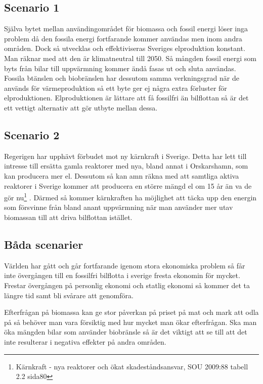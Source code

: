 \documentclass[a4paper,11pt,fleqn, titlepage]{article}
\begin{document}
\subsection{Scenario 1}

Själva bytet mellan användingområdet för biomassa och fossil energi löser inga problem då den fossila energi fortfarande kommer användas men inom andra områden. Dock så utvecklas och effektiviseras Sveriges elproduktion konstant. Man räknar med att den är klimatneutral till 2050. Så mångden fossil energi som byts från bilar till uppvärmning kommer ändå fasas ut och sluta användas. Fossila btänslen och biobränslen har dessutom samma verkningsgrad när de används för värmeproduktion så ett byte ger ej några extra förluster för elproduktionen.  Elproduktionen är lättare att få fossilfri än bilflottan så är det ett vettigt alternativ att gör utbyte mellan dessa.

\subsection{Scenario 2}
Regerigen har upphävt förbudet mot ny kärnkraft i Sverige. Detta har lett till intresse till ersätta gamla reaktorer med nya, bland annat i Orskarshamn, som kan producera mer el. Dessutom så kan amn räkna med att samtliga aktiva reaktorer i Sverige kommer att producera en större mängd el om 15 år än va de gör nu\footnote{Kärnkraft - nya reaktorer och ökat skadeståndsansvar, SOU 2009:88  tabell 2.2 sida80} . Därmed så kommer kärnkraften ha möjlighet att täcka upp den energin som försvinne från bland anant uppvärmning när man använder mer utav biomassan till att driva bilflottan istället.


\subsection{Båda scenarier}
Världen har gått och går fortfarande igenom stora ekonomiska problem så får inte övergången till en fossilfri bilflotta i sverige fresta ekonomin för mycket. Frestar övergången på personlig ekonomi och statlig ekonomi så kommer det ta längre tid samt bli svårare att genomföra.


Efterfrågan på biomassa kan ge stor påverkan på priset på mat och mark att odla på så behöver man vara försiktig med hur mycket man ökar efterfrågan. Ska man öka mängden bilar som använder biobränsle så är det viktigt att se till att det inte resulterar i negativa effekter på andra områden. 
\end{document}
